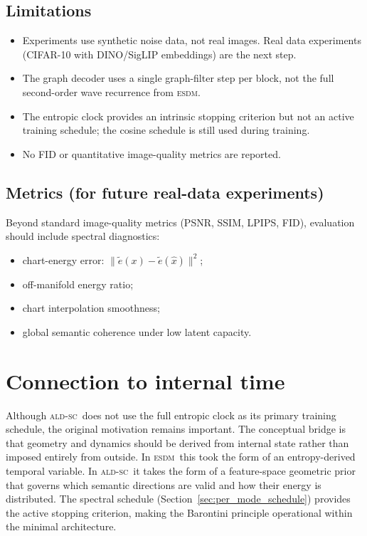 \documentclass[11pt]{article}
\newcommand{\ESDM}{\textsc{esdm}}
\newcommand{\ALDSC}{\textsc{ald-sc}}
\begin{document}
    \subsection{Limitations}
    \label{sec:limitations}
    \begin{itemize}[leftmargin=1.5em]
    \item Experiments use synthetic noise data, not real images. Real
        data experiments (CIFAR-10 with DINO/SigLIP embeddings) are
        the next step.
    \item The graph decoder uses a single graph-filter step per block,
        not the full second-order wave recurrence from \ESDM.
    \item The entropic clock provides an intrinsic stopping criterion
        but not an active training schedule; the cosine schedule is
        still used during training.
    \item No FID or quantitative image-quality metrics are reported.
    \end{itemize}

    \subsection{Metrics (for future real-data experiments)}
    \label{sec:metrics}
    Beyond standard image-quality metrics (PSNR, SSIM, LPIPS, FID),
    evaluation should include spectral diagnostics:
    \begin{itemize}[leftmargin=1.5em]
    \item chart-energy error: $\|\tilde e(x) - \tilde e(\hat x)\|^2$;
    \item off-manifold energy ratio;
    \item chart interpolation smoothness;
    \item global semantic coherence under low latent capacity.
    \end{itemize}

    \section{Connection to internal time}
    \label{sec:internal_time_connection}
    Although \ALDSC~does not use the full entropic clock as its
    primary training schedule, the original motivation remains
    important. The conceptual bridge is that geometry and dynamics
    should be derived from internal state rather than imposed entirely
    from outside. In \ESDM~this took the form of an entropy-derived
    temporal variable. In \ALDSC~it takes the form of a feature-space
    geometric prior that governs which semantic directions are valid
    and how their energy is distributed. The spectral schedule
    (Section~\ref{sec:per_mode_schedule}) provides the active
    stopping criterion, making the Barontini principle operational
    within the minimal architecture.
\end{document}
